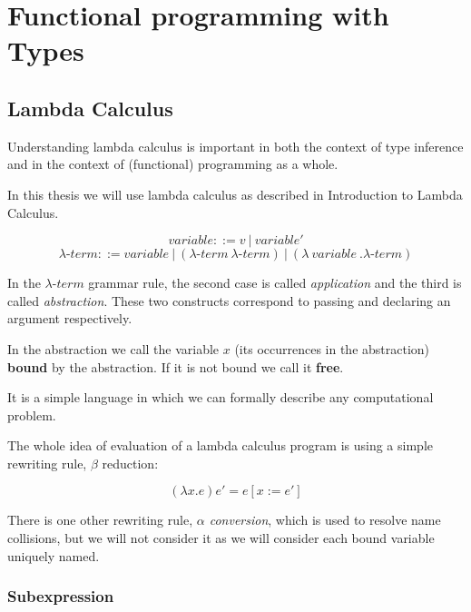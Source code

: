 \chapter{Functional programming with Types}

\section{Lambda Calculus}

Understanding lambda calculus is important in both the context of type inference and in the context of (functional) programming as a whole.

In this thesis we will use lambda calculus as described in Introduction to Lambda Calculus.

\begin{defn}
$$variable ::= v\ |\ variable'$$
$$\lambda\mbox{-}term ::= variable\ |\ (\lambda\mbox{-}term\ \lambda\mbox{-}term)\ |\ (\lambda\ variable\ . \lambda\mbox{-}term )$$
\end{defn}

In the $\lambda\mbox{-}term$ grammar rule, the second case is called \emph{application} and the third is called \emph{abstraction}. These two constructs correspond to passing and declaring an argument respectively.

\begin{defn}
    \label{defn:boundFree}
    In the abstraction we call the variable $x$ (its occurrences in the abstraction) \textbf{bound} by the abstraction. If it is not bound we call it \textbf{free}.
\end{defn}

It is a simple language in which we can formally describe any computational problem.

The whole idea of evaluation of a lambda calculus program is using a simple rewriting rule, $\beta$ reduction:

\begin{defn}
    $$(\lambda x . e) e' = e [x := e']$$ \cite{barendregt1992lambda}
\end{defn}

There is one other rewriting rule, \emph{$\alpha$ conversion}, which is used to resolve name collisions, but we will not consider it as we will consider each bound variable uniquely named.

\subsection{Subexpression}

